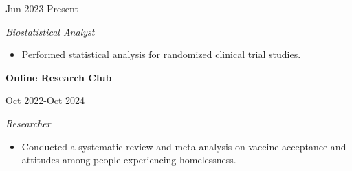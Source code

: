 \documentclass[
  16,
]{article}
\providecommand{\tightlist}{%
  \setlength{\itemsep}{0pt}\setlength{\parskip}{0pt}}\usepackage{longtable,booktabs,array}
\begin{document}
\vspace{3pt}

\begin{large}
\begin{multicols}{2}
\begin{flushleft}{\bf {}}\end{flushleft}
\begin{flushright}Jun 2023-Present\end{flushright}
\end{multicols}
\vspace{-0.17cm}
\begin{multicols}{2}
\begin{flushleft}\textit{Biostatistical Analyst}\end{flushleft}
\end{multicols}
\end{large}

\vspace{-0.16cm}

\begin{itemize}
\tightlist
\item
  Performed statistical analysis for randomized clinical trial studies.
\end{itemize}

\vspace{3pt}

\begin{large}
\begin{multicols}{2}
\begin{flushleft}{\bf Online Research Club}\end{flushleft}
\begin{flushright}Oct 2022-Oct 2024\end{flushright}
\end{multicols}
\vspace{-0.17cm}
\begin{multicols}{2}
\begin{flushleft}\textit{Researcher}\end{flushleft}
\end{multicols}
\end{large}

\vspace{-0.16cm}

\begin{itemize}
\tightlist
\item
  Conducted a systematic review and meta-analysis on vaccine acceptance
  and attitudes among people experiencing homelessness.
\end{itemize}
\end{document}
